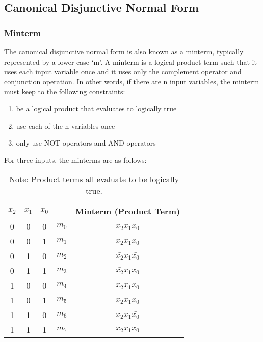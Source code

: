 \documentclass[11pt]{article}
\begin{document}
\subsection{Canonical Disjunctive Normal Form}

\subsubsection{Minterm}

The canonical disjunctive normal form is also known as a minterm, typically represented by a lower case `m'. A minterm is a logical product term such that it uses each input variable once and it uses only the complement operator and conjunction operation. In other words, if there are n input variables, the minterm must keep to the following constraints: 
\begin{enumerate}
	\item be a logical product that evaluates to logically true
	\item use each of the n variables once
	\item only use NOT operators and AND operators
\end{enumerate}

\noindent For three inputs, the minterms are as follows:

\begin{table}[H]
	\centering
	\begin{tabular}{c c c | c | c}
		\( x_2 \)	&	\( x_1 \)	&	\( x_0 \)	&	&	Minterm (Product Term)\\
		\hline
		0			&	0			&	0		&	\( m_0 \)	&	\( \bar{x_2} \bar{x_1} \bar{x_0} \) \\	
		0			&	0			&	1		&	\( m_1 \)	&	\( \bar{x_2} \bar{x_1} x_0 \) \\
		0			&	1			&	0		&	\( m_2 \)	&	\( \bar{x_2} x_1 \bar{x_0} \) \\
		0			&	1			&	1		&	\( m_3 \)	&	\( \bar{x_2} x_1 x_0 \) \\
		1			&	0			&	0		&	\( m_4 \)	&	\( x_2 \bar{x_1} \bar{x_0} \) \\
		1			&	0			&	1		&	\( m_5 \)	&	\( x_2 \bar{x_1} x_0 \) \\
		1			&	1			&	0		&	\( m_6 \)	&	\( x_2 x_1 \bar{x_0} \) \\
		1			&	1			&	1		&	\( m_7 \)	&	\( x_2 x_1 x_0 \) \\
	\end{tabular}
	\caption*{Note: Product terms all evaluate to be logically true.}
\end{table}
\end{document}
